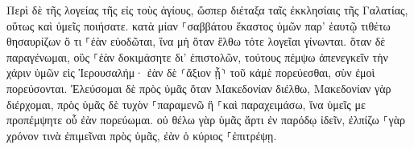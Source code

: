 \documentclass{openreader}
\begin{document}
Περὶ δὲ τῆς λογείας τῆς εἰς τοὺς ἁγίους, ὥσπερ διέταξα ταῖς ἐκκλησίαις τῆς Γαλατίας, οὕτως καὶ ὑμεῖς ποιήσατε. 
κατὰ μίαν ⸀σαββάτου ἕκαστος ὑμῶν παρ’ ἑαυτῷ τιθέτω θησαυρίζων ὅ τι ⸀ἐὰν εὐοδῶται, ἵνα μὴ ὅταν ἔλθω τότε λογεῖαι γίνωνται. 
ὅταν δὲ παραγένωμαι, οὓς ⸀ἐὰν δοκιμάσητε δι’ ἐπιστολῶν, τούτους πέμψω ἀπενεγκεῖν τὴν χάριν ὑμῶν εἰς Ἰερουσαλήμ· 
ἐὰν δὲ ⸂ἄξιον ᾖ⸃ τοῦ κἀμὲ πορεύεσθαι, σὺν ἐμοὶ πορεύσονται. 
Ἐλεύσομαι δὲ πρὸς ὑμᾶς ὅταν Μακεδονίαν διέλθω, Μακεδονίαν γὰρ διέρχομαι, 
πρὸς ὑμᾶς δὲ τυχὸν ⸀παραμενῶ ἢ ⸀καὶ παραχειμάσω, ἵνα ὑμεῖς με προπέμψητε οὗ ἐὰν πορεύωμαι. 
οὐ θέλω γὰρ ὑμᾶς ἄρτι ἐν παρόδῳ ἰδεῖν, ἐλπίζω ⸀γὰρ χρόνον τινὰ ἐπιμεῖναι πρὸς ὑμᾶς, ἐὰν ὁ κύριος ⸀ἐπιτρέψῃ. 
\end{document}
